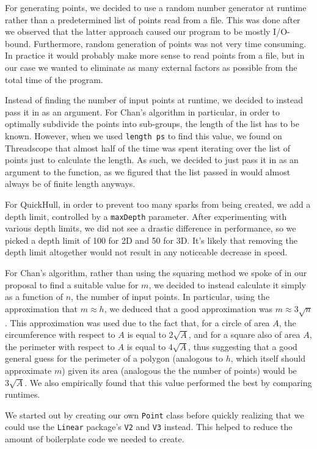 \documentclass[12pt]{article}
\begin{document}
    For generating points, we decided to use a random number generator at runtime rather than a predetermined list of points read from a file. This was done after we observed that the latter approach caused our program to be mostly I/O-bound. Furthermore, random generation of points was not very time consuming. In practice it would probably make more sense to read points from a file, but in our case we wanted to eliminate as many external factors as possible from the total time of the program.

    Instead of finding the number of input points at runtime, we decided to instead pass it in as an argument. For Chan’s algorithm in particular, in order to optimally subdivide the points into sub-groups, the length of the list has to be known. However, when we used \texttt{length ps} to find this value, we found on Threadscope that almost half of the time was spent iterating over the list of points just to calculate the length. As such, we decided to just pass it in as an argument to the function, as we figured that the list passed in would almost always be of finite length anyways.

    For QuickHull, in order to prevent too many sparks from being created, we add a depth limit, controlled by a \texttt{maxDepth} parameter. After experimenting with various depth limits, we did not see a drastic difference in performance, so we picked a depth limit of 100 for 2D and 50 for 3D. It's likely that removing the depth limit altogether would not result in any noticeable decrease in speed.

    For Chan’s algorithm, rather than using the squaring method we spoke of in our proposal to find a suitable value for $m$, we decided to instead calculate it simply as a function of $n$, the number of input points. In particular, using the approximation that $m \approx h$, we deduced that a good approximation was $m\approx3\sqrt n$. This approximation was used due to the fact that, for a circle of area $A$, the circumference with respect to $A$ is equal to $2\sqrt A$, and for a square also of area $A$, the perimeter with respect to $A$ is equal to $4\sqrt A$, thus suggesting that a good general guess for the perimeter of a polygon (analogous to $h$, which itself should approximate $m$) given its area (analogous the the number of points) would be $3\sqrt A$. We also empirically found that this value performed the best by comparing runtimes.

    We started out by creating our own \texttt{Point} class before quickly realizing that we could use the \texttt{Linear} package's \texttt{V2} and \texttt{V3} instead. This helped to reduce the amount of boilerplate code we needed to create.
\end{document}
